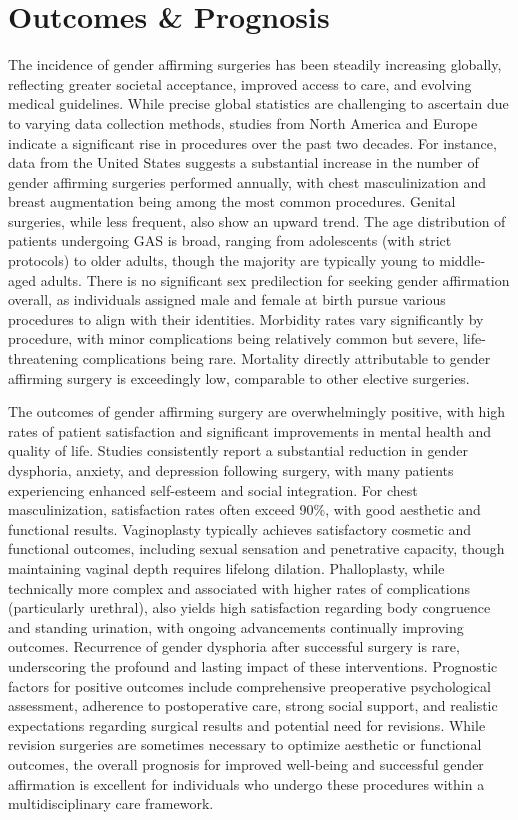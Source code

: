 \section*{Outcomes \& Prognosis}
The incidence of gender affirming surgeries has been steadily increasing globally, reflecting greater societal acceptance, improved access to care, and evolving medical guidelines. While precise global statistics are challenging to ascertain due to varying data collection methods, studies from North America and Europe indicate a significant rise in procedures over the past two decades. For instance, data from the United States suggests a substantial increase in the number of gender affirming surgeries performed annually, with chest masculinization and breast augmentation being among the most common procedures. Genital surgeries, while less frequent, also show an upward trend. The age distribution of patients undergoing GAS is broad, ranging from adolescents (with strict protocols) to older adults, though the majority are typically young to middle-aged adults. There is no significant sex predilection for seeking gender affirmation overall, as individuals assigned male and female at birth pursue various procedures to align with their identities. Morbidity rates vary significantly by procedure, with minor complications being relatively common but severe, life-threatening complications being rare. Mortality directly attributable to gender affirming surgery is exceedingly low, comparable to other elective surgeries.

The outcomes of gender affirming surgery are overwhelmingly positive, with high rates of patient satisfaction and significant improvements in mental health and quality of life. Studies consistently report a substantial reduction in gender dysphoria, anxiety, and depression following surgery, with many patients experiencing enhanced self-esteem and social integration. For chest masculinization, satisfaction rates often exceed 90\%, with good aesthetic and functional results. Vaginoplasty typically achieves satisfactory cosmetic and functional outcomes, including sexual sensation and penetrative capacity, though maintaining vaginal depth requires lifelong dilation. Phalloplasty, while technically more complex and associated with higher rates of complications (particularly urethral), also yields high satisfaction regarding body congruence and standing urination, with ongoing advancements continually improving outcomes. Recurrence of gender dysphoria after successful surgery is rare, underscoring the profound and lasting impact of these interventions. Prognostic factors for positive outcomes include comprehensive preoperative psychological assessment, adherence to postoperative care, strong social support, and realistic expectations regarding surgical results and potential need for revisions. While revision surgeries are sometimes necessary to optimize aesthetic or functional outcomes, the overall prognosis for improved well-being and successful gender affirmation is excellent for individuals who undergo these procedures within a multidisciplinary care framework.

